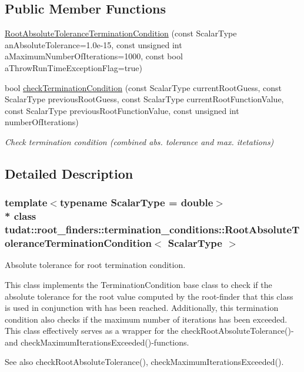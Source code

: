 \subsection*{Public Member Functions}
\begin{DoxyCompactItemize}
\item 
\hyperlink{classtudat_1_1root__finders_1_1termination__conditions_1_1RootAbsoluteToleranceTerminationCondition_a901e80917bf81456586d14129f51407a}{Root\+Absolute\+Tolerance\+Termination\+Condition} (const Scalar\+Type an\+Absolute\+Tolerance=1.\+0e-\/15, const unsigned int a\+Maximum\+Number\+Of\+Iterations=1000, const bool a\+Throw\+Run\+Time\+Exception\+Flag=true)
\item 
bool \hyperlink{classtudat_1_1root__finders_1_1termination__conditions_1_1RootAbsoluteToleranceTerminationCondition_ae0836cf6ef3594adb01ac350274062fb}{check\+Termination\+Condition} (const Scalar\+Type current\+Root\+Guess, const Scalar\+Type previous\+Root\+Guess, const Scalar\+Type current\+Root\+Function\+Value, const Scalar\+Type previous\+Root\+Function\+Value, const unsigned int number\+Of\+Iterations)
\begin{DoxyCompactList}\small\item\em Check termination condition (combined abs. tolerance and max. itetations) \end{DoxyCompactList}\end{DoxyCompactItemize}


\subsection{Detailed Description}
\subsubsection*{template$<$typename Scalar\+Type = double$>$\\*
class tudat\+::root\+\_\+finders\+::termination\+\_\+conditions\+::\+Root\+Absolute\+Tolerance\+Termination\+Condition$<$ Scalar\+Type $>$}

Absolute tolerance for root termination condition. 

This class implements the Termination\+Condition base class to check if the absolute tolerance for the root value computed by the root-\/finder that this class is used in conjunction with has been reached. Additionally, this termination condition also checks if the maximum number of iterations has been exceeded. This class effectively serves as a wrapper for the check\+Root\+Absolute\+Tolerance()-\/ and check\+Maximum\+Iterations\+Exceeded()-\/functions. \begin{DoxySeeAlso}{See also}
check\+Root\+Absolute\+Tolerance(), check\+Maximum\+Iterations\+Exceeded(). 
\end{DoxySeeAlso}


